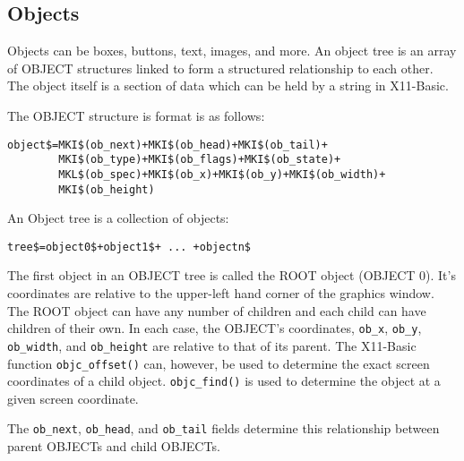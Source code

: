 \subsection{Objects}

Objects can be boxes, buttons, text, images, and more. An object tree
is an array of OBJECT structures linked to form a structured
relationship to each other. The object itself is a section of data 
which can be held by a string in X11-Basic.

The OBJECT structure is format is as follows:

\begin{verbatim}
object$=MKI$(ob_next)+MKI$(ob_head)+MKI$(ob_tail)+
        MKI$(ob_type)+MKI$(ob_flags)+MKI$(ob_state)+
        MKL$(ob_spec)+MKI$(ob_x)+MKI$(ob_y)+MKI$(ob_width)+
        MKI$(ob_height)
\end{verbatim}

An Object tree is a collection of objects:

\begin{verbatim}
tree$=object0$+object1$+ ... +objectn$
\end{verbatim}

The first object in an OBJECT tree is called the ROOT object (OBJECT 0). It's
coordinates are relative to the upper-left hand corner of the graphics window. 
The ROOT object can have any number of children and each child can have
children of their own. In each case, the OBJECT's coordinates, \verb|ob_x|,
\verb|ob_y|, \verb|ob_width|, and \verb|ob_height| are relative to that of its
parent. The X11-Basic function \verb|objc_offset()| can, however, be used to
determine the exact screen coordinates of a child object. \verb|objc_find()| is
used to determine the object at a given screen coordinate.

The \verb|ob_next|, \verb|ob_head|, and \verb|ob_tail| fields determine this
relationship between parent OBJECTs and child OBJECTs.

